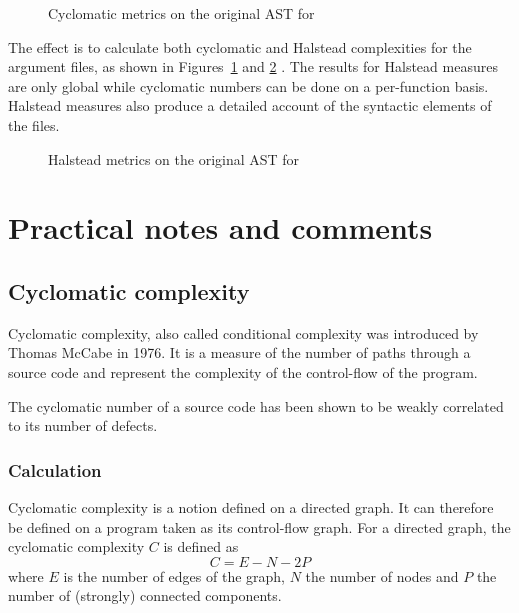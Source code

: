 \documentclass{frama-c-book}
\begin{document}
\begin{shell}[escapechar={\#}]
\end{shell}

\begin{figure}
  \centering
  
  \caption{Cyclomatic metrics on the original AST for \pgname}
  \label{fig:cabs_metrics_cyclo}
\end{figure}

The effect is to calculate both cyclomatic and Halstead complexities for the
argument files, as shown in Figures~\ref{fig:cabs_metrics_cyclo} and
\ref{fig:cabs_metrics_halstead} . The results for
Halstead measures are only global while cyclomatic numbers can be done on a
per-function basis. Halstead measures also produce a detailed account
of the syntactic elements of the files.

\begin{figure}
  \centering
  
  \caption{Halstead metrics on the original AST for \pgname}
  \label{fig:cabs_metrics_halstead}
\end{figure}


\chapter{Practical notes and comments}
\label{cha:pract-notes-comm}

\section{Cyclomatic complexity}
\label{sec:cycl-compl}

Cyclomatic complexity, also called conditional complexity was introduced by
Thomas \mbox{McCabe} \cite{DBLP:journals/tse/McCabe76} in 1976. It is a measure of the
number of paths through a source code and represent the complexity of the
control-flow of the program.

The cyclomatic number of a source code has been shown to be weakly correlated to
its number of defects.

\subsection{Calculation}

Cyclomatic complexity is a notion defined on a directed graph. It can therefore
be defined on a program taken as its control-flow graph. For a directed graph,
the cyclomatic complexity $C$ is defined as
\[ C = E - N - 2P \] where $E$ is the number of edges of the graph, $N$ the
number of nodes and $P$ the number of (strongly) connected components.
\end{document}
